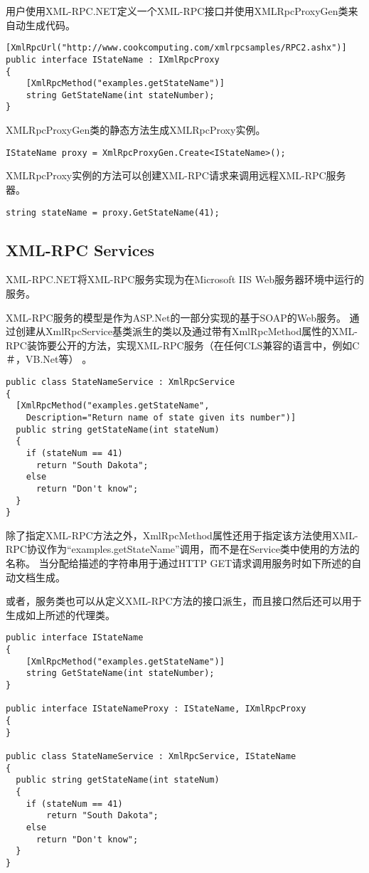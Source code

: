 用户使用XML-RPC.NET定义一个XML-RPC接口并使用XMLRpcProxyGen类来自动生成代码。

\begin{lstlisting}
[XmlRpcUrl("http://www.cookcomputing.com/xmlrpcsamples/RPC2.ashx")]
public interface IStateName : IXmlRpcProxy
{
    [XmlRpcMethod("examples.getStateName")]
    string GetStateName(int stateNumber); 
}
\end{lstlisting}

XMLRpcProxyGen类的静态方法生成XMLRpcProxy实例。

\begin{lstlisting}
IStateName proxy = XmlRpcProxyGen.Create<IStateName>();
\end{lstlisting}

XMLRpcProxy实例的方法可以创建XML-RPC请求来调用远程XML-RPC服务器。

\begin{lstlisting}
string stateName = proxy.GetStateName(41);
\end{lstlisting}



\subsection{XML-RPC Services}

XML-RPC.NET将XML-RPC服务实现为在Microsoft IIS Web服务器环境中运行的服务。 

XML-RPC服务的模型是作为ASP.Net的一部分实现的基于SOAP的Web服务。 通过创建从XmlRpcService基类派生的类以及通过带有XmlRpcMethod属性的XML-RPC装饰要公开的方法，实现XML-RPC服务（在任何CLS兼容的语言中，例如C＃，VB.Net等） 。


\begin{lstlisting}
public class StateNameService : XmlRpcService 
{
  [XmlRpcMethod("examples.getStateName",
    Description="Return name of state given its number")] 
  public string getStateName(int stateNum)
  {
    if (stateNum == 41)
      return "South Dakota";
    else
      return "Don't know";
  }
}
\end{lstlisting}

除了指定XML-RPC方法之外，XmlRpcMethod属性还用于指定该方法使用XML-RPC协议作为“examples.getStateName”调用，而不是在Service类中使用的方法的名称。 当分配给描述的字符串用于通过HTTP GET请求调用服务时如下所述的自动文档生成。

或者，服务类也可以从定义XML-RPC方法的接口派生，而且接口然后还可以用于生成如上所述的代理类。 

\begin{lstlisting}
public interface IStateName
{
    [XmlRpcMethod("examples.getStateName")]
    string GetStateName(int stateNumber); 
}

public interface IStateNameProxy : IStateName, IXmlRpcProxy
{
}

public class StateNameService : XmlRpcService, IStateName
{
  public string getStateName(int stateNum)
  {
    if (stateNum == 41)
        return "South Dakota";
    else
      return "Don't know";
  }
}
\end{lstlisting}

